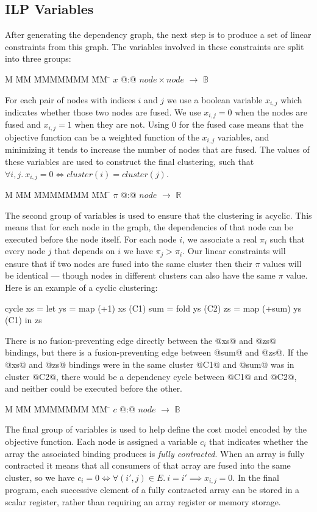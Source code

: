 \subsection{ILP Variables}
After generating the dependency graph, the next step is to produce a set of linear constraints from this graph. The variables involved in these constraints are split into three groups:
\begin{tabbing}
M   \= MM \= MMMMMMM \= MM \= \kill
$x$   \> @:@  \> $node \times node$ \> $\to$ \> $\mathbb{B}$
\end{tabbing}
For each pair of nodes with indices $i$ and $j$ we use a boolean variable $x_{i,j}$ which indicates whether those two nodes are fused. We use $x_{i,j} = 0$ when the nodes are fused and $x_{i,j} = 1$ when they are not. Using $0$ for the fused case means that the objective function can be a weighted function of the $x_{i,j}$ variables, and minimizing it tends to increase the number of nodes that are fused. The values of these variables are used to construct the final clustering, such that $\forall i,j.\ x_{i,j} = 0 \iff cluster(i) = cluster(j)$.
\begin{tabbing}
M   \= MM \= MMMMMMM \= MM \= \kill
$\pi$ \> @:@  \> $node$             \> $\to$ \> $\mathbb{R}$
\end{tabbing}
The second group of variables is used to ensure that the clustering is acyclic. This means that for each node in the graph, the dependencies of that node can be executed before the node itself. For each node $i$, we associate a real $\pi_i$ such that every node $j$ that depends on $i$ we have $\pi_j > \pi_i$. Our linear constraints will ensure that if two nodes are fused into the same cluster then their $\pi$ values will be identical --- though nodes in different clusters can also have the same $\pi$ value. Here is an example of a cyclic clustering:
\begin{code}
  cycle xs  = let ys  = map (+1) xs     (C1)
                  sum = fold ys         (C2)
                  zs  = map (+sum) ys   (C1)
              in  zs
\end{code}
There is no fusion-preventing edge directly between the @xs@ and @zs@ bindings, but there is a fusion-preventing edge between @sum@ and @zs@. If the @xs@ and @zs@ bindings were in the same cluster @C1@ and @sum@ was in cluster @C2@, there would be a dependency cycle between @C1@ and @C2@, and neither could be executed before the other.
\begin{tabbing}
M   \= MM \= MMMMMMM \= MM \= \kill
$c$   \> @:@  \> $node$             \> $\to$ \> $\mathbb{B}$
\end{tabbing}
The final group of variables is used to help define the cost model encoded by the objective function. Each node is assigned a variable $c_i$ that indicates whether the array the associated binding produces is \emph{fully contracted}. When an array is fully contracted it means that all consumers of that array are fused into the same cluster, so we have $c_i = 0 \iff \forall (i',j) \in E.\ i = i' \implies x_{i,j} = 0$. In the final program, each successive element of a fully contracted array can be stored in a scalar register, rather than requiring an array register or memory storage. 


